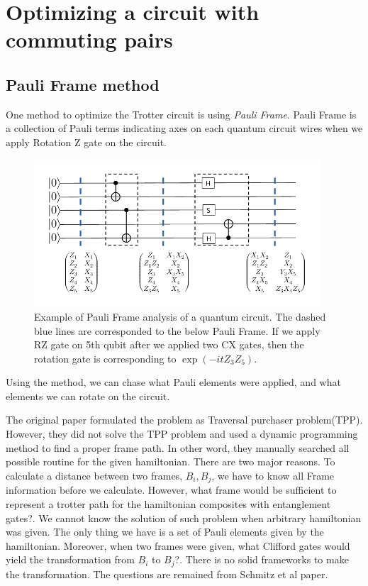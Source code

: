\documentclass[a4paper,12pt]{article}
\begin{document}
\section{Optimizing a circuit with commuting pairs}

\subsection{Pauli Frame method}

One method to optimize the Trotter circuit is using \textit{Pauli Frame}\cite{schmitz_graph_2023}.
Pauli Frame is a collection of Pauli terms indicating axes on each quantum circuit wires
when we apply Rotation Z gate on the circuit.

\begin{figure}
    \centering
    \includegraphics[width = 0.95\textwidth]{figures/Pauli Frame.png}
    \caption{
        Example of Pauli Frame analysis of a quantum circuit. 
        The dashed blue lines are corresponded to the below Pauli Frame.
        If we apply RZ gate on 5th qubit after we applied two CX gates,
        then the rotation gate is corresponding to $\exp(-i t Z_3Z_5)$.
    }
    \label{fig:Pauli Frame}
\end{figure}

Using the method, we can chase what Pauli elements were applied, 
and what elements we can rotate on the circuit.


The original paper formulated the problem as 
Traversal purchaser problem(TPP)\cite{schmitz_graph_2023}.
However, they did not solve the TPP problem and 
used a dynamic programming method to find a proper frame path.
In other word, they manually searched all possible routine
for the given hamiltonian.
There are two major reasons.
To calculate a distance between two frames, $B_i, B_j$, we have to know
all Frame information before we calculate.
However, what frame would be sufficient to represent a trotter path 
for the hamiltonian composites with entanglement gates?.
We cannot know the solution of such problem when arbitrary hamiltonian was given.
The only thing we have is a set of Pauli elements given by the hamiltonian.
Moreover, when two frames were given, what Clifford gates would yield the 
transformation from $B_i$ to $B_j$?.
There is no solid frameworks to make the transformation.
The questions are remained from Schmitz et al paper.
\end{document}
